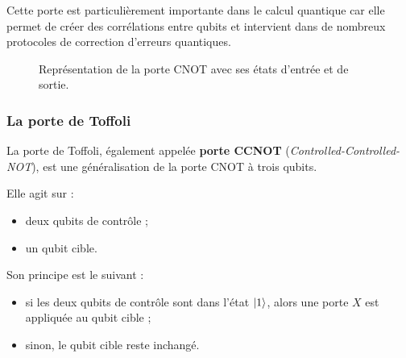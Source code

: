 \documentclass[a4paper,12pt]{article}
\begin{document}
Cette porte est particulièrement importante dans le calcul quantique car elle permet de créer des corrélations entre qubits et intervient dans de nombreux protocoles de correction d’erreurs quantiques.

\begin{figure}[H]
\centering
{}
\caption{Représentation de la porte CNOT avec ses états d'entrée et de sortie.}
\end{figure}

\subsubsection{La porte de Toffoli}

La porte de Toffoli, également appelée \textbf{porte CCNOT} (\textit{Controlled-Controlled-NOT}), est une généralisation de la porte CNOT à trois qubits.

Elle agit sur :

\begin{itemize}
    \item deux qubits de contrôle ;
    \item un qubit cible.
\end{itemize}

Son principe est le suivant :

\begin{itemize}
    \item si les deux qubits de contrôle sont dans l’état $\ket{1}$, alors une porte $X$ est appliquée au qubit cible ;
    \item sinon, le qubit cible reste inchangé.
\end{itemize}
\end{document}
